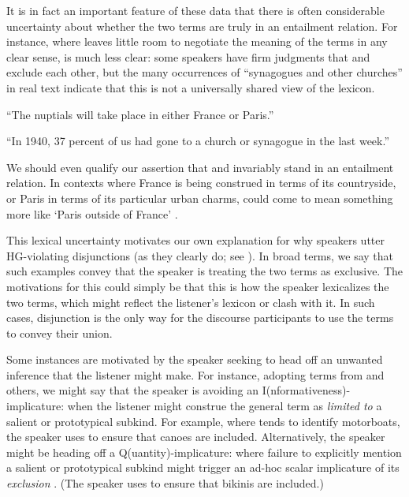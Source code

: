\documentclass{article}
\begin{document}
It is in fact an important feature of these data that there is often
considerable uncertainty about whether the two terms are truly in an
entailment relation. For instance, where
 leaves little room to negotiate the
meaning of the terms in any clear sense,
 is much less clear: some speakers
have firm judgments that  and  exclude
each other, but the many occurrences of ``synagogues and other
churches'' in real text indicate that this is not a universally shared
view of the lexicon.

\begin{examples}
\item\label{exclusive}
  \begin{examples}
  \item\label{franceorparis} ``The nuptials will take place in either
    France or Paris.''
  \item\label{churchorsynagogue} ``In 1940, 37 percent of us had gone
    to a church or synagogue in the last week.''
  \end{examples}
\end{examples}

We should even qualify our assertion that  and
 invariably stand in an entailment relation. In contexts
where France is being construed in terms of its countryside, or Paris
in terms of its particular urban charms,  could come to
mean something more like `Paris outside of France'
\citep{Rohdenburg:1985}.

This lexical uncertainty motivates our own explanation for why
speakers utter HG-violating disjunctions (as they clearly do; see
).  In broad terms, we say that such examples convey
that the speaker is treating the two terms as exclusive. The
motivations for this could simply be that this is how the speaker
lexicalizes the two terms, which might reflect the listener's lexicon
or clash with it. In such cases, disjunction is the only way for the
discourse participants to use the terms to convey their union.

Some instances are motivated by the speaker seeking to head off an
unwanted inference that the listener might make. For instance,
adopting terms from \citet{Levinson00} and others, we might say that
the speaker is avoiding an I(nformativeness)-implicature: when the
listener might construe the general term as \emph{limited to} a
salient or prototypical subkind. For example, where  tends
to identify motorboats, the speaker uses  to
ensure that canoes are included. Alternatively, the speaker might be
heading off a Q(uantity)-implicature: where failure to explicitly
mention a salient or prototypical subkind might trigger an ad-hoc
scalar implicature of its \emph{exclusion}
\citep{hirschberg:1985}. (The speaker uses 
to ensure that bikinis are included.)
\end{document}
